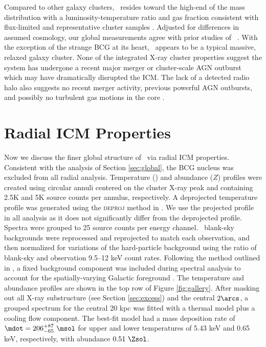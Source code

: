 \documentclass[useAMS,usenatbib]{mn2e}
\begin{document}
Compared to other galaxy clusters, \rxj\ resides toward the high-end
of the mass distribution with a luminosity-temperature ratio and gas
fraction consistent with flux-limited and representative cluster
samples \citep{hiflugcs2, 2009A&A...498..361P}. Adjusted for
differences in assumed cosmology, our global measurements agree with
prior studies of \irs\ \citep[\eg][]{2000MNRAS.315..269A}. With the
exception of the strange BCG at its heart, \rxj\ appears to be a
typical massive, relaxed galaxy cluster. None of the integrated X-ray
cluster properties suggest the system has undergone a recent major
merger or cluster-scale AGN outburst which may have dramatically
disrupted the ICM. The lack of a detected radio halo also suggests no
recent merger activity, previous powerful AGN outbursts, and possibly
no turbulent gas motions in the core
\citep[\eg][]{2008SSRv..134...93F}.

\section{Radial ICM Properties}
\label{sec:rad}

Now we discuss the finer global structure of \rxj\ via radial ICM
properties. Consistent with the analysis of Section \ref{sec:global},
the BCG nucleus was excluded from all radial analysis. Temperature
(\tx) and abundance ($Z$) profiles were created using circular annuli
centered on the cluster X-ray peak and containing 2.5K and 5K source
counts per annulus, respectively. A deprojected temperature profile
was generated using the \textsc{deproj} method in \xspec. We use the
projected profile in all analysis as it does not significantly differ
from the deprojected profile. Spectra were grouped to 25 source counts
per energy channel. \caldb\ blank-sky backgrounds were reprocessed and
reprojected to match each observation, and then normalized for
variations of the hard-particle background using the ratio of
blank-sky and observation 9.5--12 keV count rates. Following the method
outlined in \citet{2005ApJ...628..655V}, a fixed background component
was included during spectral analysis to account for the
spatially-varying Galactic foreground \citep[see][for more
  detail]{xrayband}. The temperature and abundance profiles are shown
in the top row of Figure \ref{fig:gallery}. After masking out all
X-ray substructure (see Section \ref{sec:excess}) and the central
$2\arcs$, a grouped spectrum for the central 20 kpc was fitted with a
thermal model plus a cooling flow component. The best-fit model had a
mass deposition rate of $\mdot = 206^{+87}_{-65} ~\msol$ for upper and
lower temperatures of 5.43 keV and 0.65 keV, respectively, with
abundance $0.51 ~\Zsol$.
\end{document}
